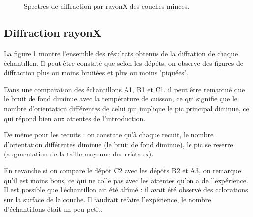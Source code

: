 \documentclass[a4paper,12pt,oneside]{article}
\begin{document}
\begin{figure}[!ht]
	\\
	\hfill
	\hfill
	\\
	\begin{center}
	\end{center}
	\caption{Spectres de diffraction par rayonX des couches minces.}
	\label{fig:diff_main}
\end{figure}

\subsection{Diffraction rayonX}
La figure \ref{fig:diff_main} montre l'ensemble des résultats obtenus de la diffration de chaque échantillon. Il peut être constaté que selon les dépôts, on observe des figures de diffraction plus ou moins bruitées et plus ou moins "piquées".

Dans une comparaison des échantillons A1, B1 et C1, il peut être remarqué que le bruit de fond diminue avec la température de cuisson, ce qui signifie que le nombre d'orientation différentes de celui qui implique le pic principal diminue, ce qui répond bien aux attentes de l'introduction.

De même pour les recuits : on constate qu'à chaque recuit, le nombre d'orientation différentes diminue (le bruit de fond diminue), le pic se reserre (augmentation de la taille moyenne des cristaux).

En revanche si on compare le dépôt C2 avec les dépôts B2 et A3, on remarque qu'il est moins bons, ce qui ne colle pas avec les attentes qu'on a de l'expérience. Il est possible que l'échantillon ait été abîmé : il avait été observé des colorations sur la surface de la couche. Il faudrait refaire l'expérience, le nombre d'échantillons était un peu petit.
\end{document}
